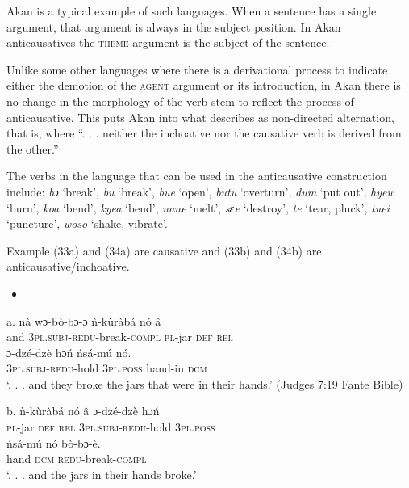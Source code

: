 \documentclass[output=paper]{langsci/langscibook}
\begin{document}
Akan is a typical example of such languages. When a sentence has a single argument, that argument is always in the subject position. In Akan anticausatives the \textsc{theme} argument is the subject of the sentence. 

Unlike some other languages where there is a derivational process to indicate either the demotion of the \textsc{agent} argument or its introduction, in Akan there is no change in the morphology of the verb stem to reflect the process of anticausative. This puts Akan into what \citet[91]{Haspelmath1993} describes as non-directed alternation, that is, where “. . . neither the inchoative nor the causative verb is derived from the other.”

The verbs in the language that can be used in the anticausative construction include: \emph{bɔ} ‘break’, \emph{bu} ‘break’, \emph{bue} ‘open’, \emph{butu} ‘overturn’, \emph{dum} ‘put out’, \emph{hyew} ‘burn’, \emph{koa} ‘bend’, \emph{kyea} ‘bend’, \emph{nane} ‘melt’, \emph{sԑe} ‘destroy’, \emph{te} ‘tear, pluck’, \emph{tuei} ‘puncture’, \emph{woso} ‘shake, vibrate’. 

Example (33a) and (34a) are causative and (33b) and (34b) are anticausative/inchoative.

\begin{itemize}
\item \end{itemize}
\gll a.  n\`{a}  wɔ-b\`{o}-bɔ-ɔ       \`{n}-k\`{u}r\`{a}b\'{a}   n\'{o}  â \\
       and  \textsc{3pl.subj}{}-\textsc{redu}{}-break\textsc{{}-compl}  \textsc{pl}{}-jar    \textsc{def}  \textsc{rel}  \\
\gll   ɔ{}-dz\'{e}-dz\`{e}    hɔ\'{n}    \'{n}s\'{a}-m\'{u}    n\'{o}.   \\
             \textsc{3pl.subj}{}-\textsc{redu}{}-hold  \textsc{3pl.poss}  hand-in  \textsc{dcm}\\
\glt ‘. . .  and they broke the jars that were in their hands.’ (Judges 7:19 Fante Bible)
\z

\gll  b.  \`{n}-k\`{u}r\`{a}b\'{a}   n\'{o}  â  ɔ{}-dz\'{e}-dz\`{e}    hɔ\'{n}  \\
       \textsc{pl}{}-jar    \textsc{def}  \textsc{rel}  \textsc{3pl.subj}{}-\textsc{redu}{}-hold  \textsc{3pl.poss}\\
\gll   \'{n}s\'{a}-m\'{u}    n\'{o}    b\`{o}-bɔ-\`{e}.\\
       hand    \textsc{dcm}    \textsc{redu}{}-break-\textsc{compl}\\
\glt ‘. . .  and the jars in their hands broke.’
\z
\end{document}
